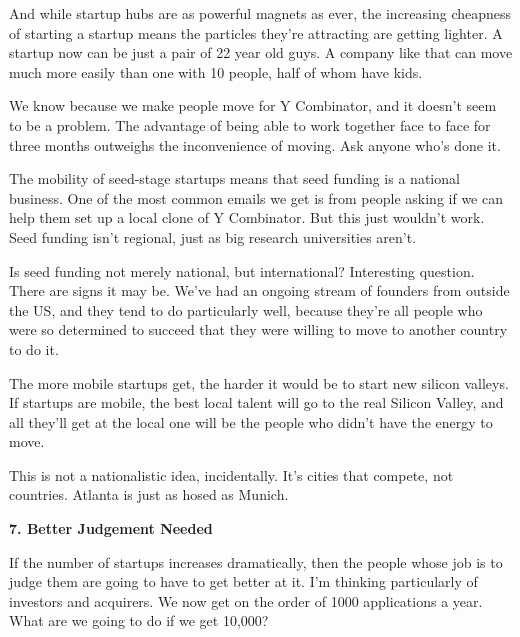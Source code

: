 And while startup hubs are as powerful
                    magnets as ever, the increasing cheapness of starting a
                    startup means the particles they're attracting are getting
                    lighter. A startup now can be just a pair of 22 year old
                    guys. A company like that can move much more easily than one
                    with 10 people, half of whom have kids.

We know
                    because we make people move for Y Combinator, and it doesn't
                    seem to be a problem. The advantage of being able to work
                    together face to face for three months outweighs the
                    inconvenience of moving. Ask anyone who's done it.

The
                    mobility of seed-stage startups means that seed funding is a
                    national business. One of the most common emails we get is
                    from people asking if we can help them set up a local clone
                    of Y Combinator. But this just wouldn't work. Seed funding
                    isn't regional, just as big research universities aren't.

Is
                    seed funding not merely national, but international?
                    Interesting question. There are signs it may be. We've had
                    an ongoing stream of founders from outside the US, and they
                    tend to do particularly well, because they're all people who
                    were so determined to succeed that they were willing to move
                    to another country to do it.

The more mobile
                    startups get, the harder it would be to start new silicon
                    valleys. If startups are mobile, the best local talent will
                    go to the real Silicon Valley, and all they'll get at the
                    local one will be the people who didn't have the energy to
                    move.

This is not a nationalistic idea,
                    incidentally. It's cities that compete, not countries.
                    Atlanta is just as hosed as Munich.

\textbf{7. Better Judgement Needed}

If the number of startups increases
                    dramatically, then the people whose job is to judge them are
                    going to have to get better at it. I'm thinking particularly
                    of investors and acquirers. We now get on the order of 1000
                    applications a year. What are we going to do if we get
                    10,000?

